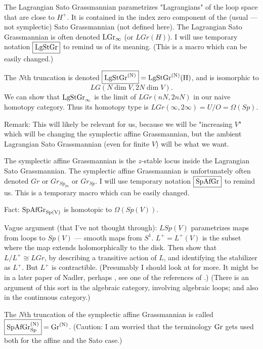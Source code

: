 { 

The Lagrangian Sato Grassmannian parametrizes "Lagrangians" of the loop space that are close to $H^+$.
It is contained in the index zero component of the (usual --- not symplectic) Sato Grassmannian (not defined here).
The Lagrangian Sato Grassmannian  is often denoted $\rm{LGr}_\infty$ (or $LGr(H)$).  I will use temporary notation $\boxed{\rm{LgStGr}}$ to remind us of its meaning. (This is a macro which can be easily changed.)


The $N$th truncation is denoted $\boxed{\rm{LgStGr}^{(N)}} = \rm{LgStGr}^{(N)}(H)$, and is isomorphic to $$LG(N \dim V, 2N \dim V).$$
We can show that $\rm{LgStGr}_\infty$ is the limit of $LGr(nN, 2nN)$ in our naive homotopy category.   Thus its homotopy type is $LGr(\infty, 2 \infty) = U/O = \Omega(Sp)$.

Remark:
This will likely be relevant for us, because we will be "increasing $V$" which will be changing the symplectic affine Grassmannian, but the ambient Lagrangian Sato Grassmannian (even for finite $V$) will be what we want.  


The symplectic affine Grassmannian is the $z$-stable locus inside the Lagrangian Sato Grassmannian.
The symplectic affine Grassmannian is  unfortunately 
often denoted  $Gr$ or $Gr_{Sp_{2n}}$ or $Gr_{Sp}$. I will use temporary notation $\boxed{\rm{SpAfGr}}$ to remind us.  This is a temporary macro which can be easily changed.

Fact:  $\rm{SpAfGr}_{Sp(V)}$ is homotopic to $\Omega(Sp(V))$.

Vague argument (that I've not thought through):    $L Sp(V)$ parametrizes maps from loops to $Sp(V)$ --- smooth maps from $S^1$.  $\boxed{L^+} =L^+(V)$ is the subset where the map extends holomorphically to the disk.  Then show that $L/L^+ \cong LGr$, by describing a transitive action of $L$, and identifying the stabilizer as $L^+$.  But $L^+$ is contractible.  (Presumably I should look at \cite{ps} for more. It might be in a later paper of  Nadler, perhaps \cite{nadler}, see one of the references of \cite{zhu}.)   (There is an argument of this sort in the algebraic category, involving algebraic loops; and also in the continuous category.)

The $N$th truncation of the symplectic affine Grassmannian is 
called $\boxed{\rm{SpAfGr}_{Sp}^{(N)}} = \rm{Gr}^{(N)}$.  (Caution:  I am worried that the terminology  $\rm{Gr}$  gets used both for the affine and the Sato case.)

}
